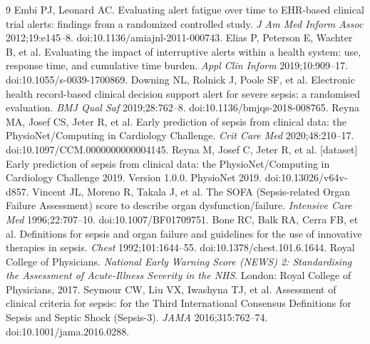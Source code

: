\documentclass[11pt]{article}
\begin{document}
\begin{thebibliography}{9}
 Embi PJ, Leonard AC. Evaluating alert fatigue over time to
EHR-based clinical trial alerts: findings from a randomized controlled study.
\textit{J Am Med Inform Assoc} 2012;19:e145--8. doi:10.1136/amiajnl-2011-000743.
 Elias P, Peterson E, Wachter B, et al. Evaluating the impact
of interruptive alerts within a health system: use, response time, and cumulative
time burden. \textit{Appl Clin Inform} 2019;10:909--17.
doi:10.1055/s-0039-1700869.
 Downing NL, Rolnick J, Poole SF, et al. Electronic health
record-based clinical decision support alert for severe sepsis: a randomised
evaluation. \textit{BMJ Qual Saf} 2019;28:762--8. doi:10.1136/bmjqs-2018-008765.
 Reyna MA, Josef CS, Jeter R, et al. Early prediction of
sepsis from clinical data: the PhysioNet/Computing in Cardiology Challenge.
\textit{Crit Care Med} 2020;48:210--17. doi:10.1097/CCM.0000000000004145.
 Reyna M, Josef C, Jeter R, et al. [dataset] Early
prediction of sepsis from clinical data: the PhysioNet/Computing in Cardiology
Challenge 2019. Version 1.0.0. PhysioNet 2019.
doi:10.13026/v64v-d857.
 Vincent JL, Moreno R, Takala J, et al. The SOFA
(Sepsis-related Organ Failure Assessment) score to describe organ
dysfunction/failure. \textit{Intensive Care Med} 1996;22:707--10.
doi:10.1007/BF01709751.
 Bone RC, Balk RA, Cerra FB, et al. Definitions for sepsis and
organ failure and guidelines for the use of innovative therapies in sepsis.
\textit{Chest} 1992;101:1644--55. doi:10.1378/chest.101.6.1644.
 Royal College of Physicians. \textit{National Early
Warning Score (NEWS) 2: Standardising the Assessment of Acute-Illness Severity
in the NHS}. London: Royal College of Physicians, 2017.
 Seymour CW, Liu VX, Iwashyna TJ, et al. Assessment
of clinical criteria for sepsis: for the Third International Consensus
Definitions for Sepsis and Septic Shock (Sepsis-3). \textit{JAMA}
2016;315:762--74. doi:10.1001/jama.2016.0288.
\end{thebibliography}
\end{document}
